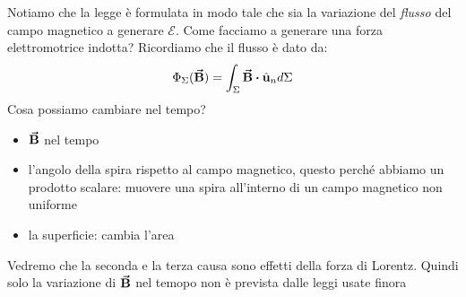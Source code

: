 Notiamo che la legge è formulata in modo tale che sia la variazione del \textit{flusso} del campo magnetico a generare $\mathcal{E}$. Come facciamo a generare una forza elettromotrice indotta? Ricordiamo che il flusso è dato da:
\begin{equation*}
	\Phi_\Sigma(\vba B)=\int_\Sigma \vba B\vdot \vbh{u}_n d\Sigma	
\end{equation*}
Cosa possiamo cambiare nel tempo? 
\begin{itemize}
	\item $\vb*{\va{B}}$ nel tempo
	\item l'angolo della spira rispetto al campo magnetico, questo perché abbiamo un prodotto scalare: muovere una spira all'interno di un campo magnetico non uniforme
	\item la superficie: cambia l'area
\end{itemize}


Vedremo che la seconda e la terza causa sono effetti della forza di Lorentz. Quindi solo la variazione di $\vb*{\va{B}}$ nel temopo  non è prevista dalle leggi usate finora


